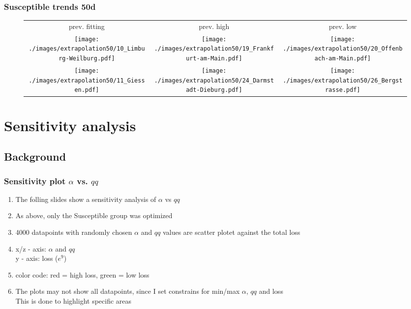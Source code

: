 \documentclass{beamer}
\begin{document}
\begin{frame}
	\frametitle{Susceptible trends 50d}
	\begin{center}
		\begin{figure}
			\begin{adjustwidth}{-0.8cm}{}
			\begin{tabular}{ccc}
				prev. fitting & prev. high & prev. low \\
				\texttt{[image: ./images/extrapolation50/10\_Limburg-Weilburg.pdf]}
					& \texttt{[image: ./images/extrapolation50/19\_Frankfurt-am-Main.pdf]}
					& \texttt{[image: ./images/extrapolation50/20\_Offenbach-am-Main.pdf]} \\
				\texttt{[image: ./images/extrapolation50/11\_Giessen.pdf]}
					& \texttt{[image: ./images/extrapolation50/24\_Darmstadt-Dieburg.pdf]}
					& \texttt{[image: ./images/extrapolation50/26\_Bergstrasse.pdf]}
			\end{tabular}
			\end{adjustwidth}
		\end{figure}
	\end{center}
\end{frame}



\section{Sensitivity analysis}
\subsection{Background}
\begin{frame}
	\frametitle{Sensitivity plot $\alpha$ vs. $qq$}
	\begin{enumerate}[$\bullet$]
		\item The folling slides show a sensitivity analysis of $\alpha$ vs $qq$
		\item As above, only the Susceptible group was optimized
		\item 4000 datapoints with randomly chosen $\alpha$ and $qq$ values are scatter plotet against the total loss
		\item x/z - axis: $\alpha$ and $qq$\\
			y - axis: loss ($e^{9}$)
		\item color code: red = high loss, green = low loss
		\item The plots may not show all datapoints, since I set constrains for min/max $\alpha$, $qq$ and loss\\
			This is done to highlight specific areas
	\end{enumerate}
\end{frame}
\end{document}
